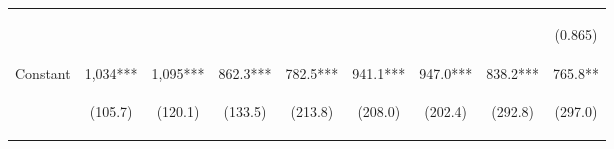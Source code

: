 \begin{landscape}
\begin{table}[htpb!]
\begin{center}
\begin{tabular}{lcccccccc}
	& \begin{footnotesize}		\end{footnotesize} & \begin{footnotesize}		\end{footnotesize} & \begin{footnotesize}		\end{footnotesize} & \begin{footnotesize}		\end{footnotesize} & \begin{footnotesize}		\end{footnotesize} & \begin{footnotesize}		\end{footnotesize} & \begin{footnotesize}		\end{footnotesize} & \begin{footnotesize}	(0.865)	\end{footnotesize} \\	
Constant	&	1,034***	&	1,095***	&	862.3***	&	782.5***	&	941.1***	&	947.0***	&	838.2***	&	765.8**	\\	
	& \begin{footnotesize}	(105.7)	\end{footnotesize} & \begin{footnotesize}	(120.1)	\end{footnotesize} & \begin{footnotesize}	(133.5)	\end{footnotesize} & \begin{footnotesize}	(213.8)	\end{footnotesize} & \begin{footnotesize}	(208.0)	\end{footnotesize} & \begin{footnotesize}	(202.4)	\end{footnotesize} & \begin{footnotesize}	(292.8)	\end{footnotesize} & \begin{footnotesize}	(297.0)	\end{footnotesize} \\	

\end{tabular}
\end{center}
\end{table}
\end{landscape}
